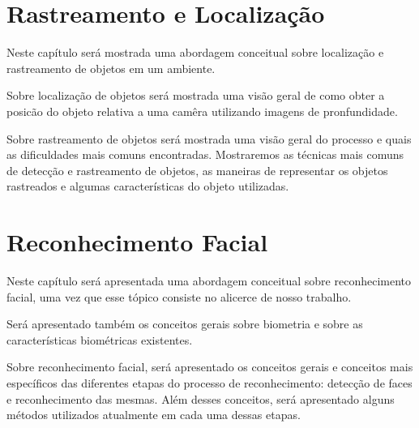\chapter{Rastreamento e Localização}

	Neste capítulo será mostrada uma abordagem conceitual sobre localização e rastreamento de objetos em um ambiente.

	Sobre localização de objetos será mostrada uma visão geral de como obter a posicão do objeto relativa a uma camêra utilizando imagens de pronfundidade.

	Sobre rastreamento de objetos será mostrada uma visão geral do processo e quais as dificuldades mais comuns encontradas. Mostraremos as técnicas mais comuns de detecção e rastreamento de objetos, as maneiras de representar os objetos rastreados e algumas características do objeto utilizadas.

	
	

	

\chapter{Reconhecimento Facial}

	Neste capítulo será apresentada uma abordagem conceitual sobre reconhecimento facial, uma vez que esse tópico consiste no alicerce de nosso trabalho. 

	Será apresentado também os conceitos gerais sobre biometria e sobre as características biométricas existentes.

	Sobre reconhecimento facial, será apresentado os conceitos gerais e conceitos mais específicos das diferentes etapas do processo de reconhecimento: detecção de faces e reconhecimento das mesmas. Além desses conceitos, será apresentado alguns métodos utilizados atualmente em cada uma dessas etapas.


	
	






























